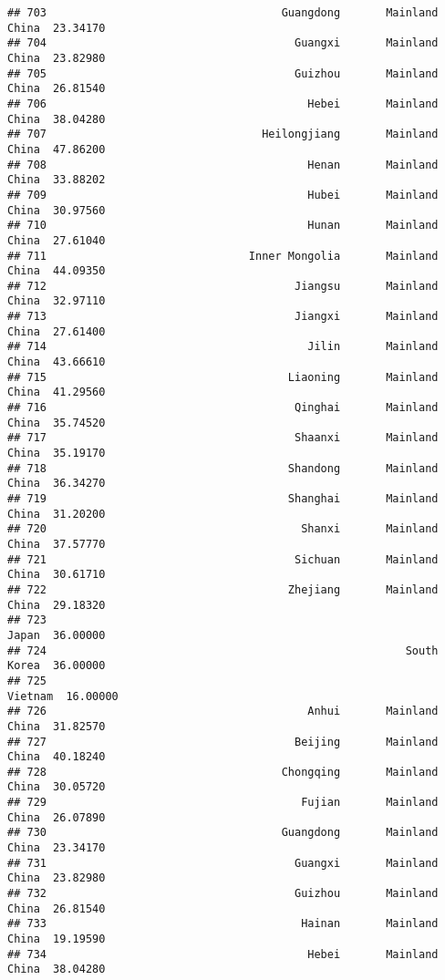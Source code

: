 \documentclass[
]{article}
\begin{document}
\begin{verbatim}
## 703                                    Guangdong       Mainland China  23.34170
## 704                                      Guangxi       Mainland China  23.82980
## 705                                      Guizhou       Mainland China  26.81540
## 706                                        Hebei       Mainland China  38.04280
## 707                                 Heilongjiang       Mainland China  47.86200
## 708                                        Henan       Mainland China  33.88202
## 709                                        Hubei       Mainland China  30.97560
## 710                                        Hunan       Mainland China  27.61040
## 711                               Inner Mongolia       Mainland China  44.09350
## 712                                      Jiangsu       Mainland China  32.97110
## 713                                      Jiangxi       Mainland China  27.61400
## 714                                        Jilin       Mainland China  43.66610
## 715                                     Liaoning       Mainland China  41.29560
## 716                                      Qinghai       Mainland China  35.74520
## 717                                      Shaanxi       Mainland China  35.19170
## 718                                     Shandong       Mainland China  36.34270
## 719                                     Shanghai       Mainland China  31.20200
## 720                                       Shanxi       Mainland China  37.57770
## 721                                      Sichuan       Mainland China  30.61710
## 722                                     Zhejiang       Mainland China  29.18320
## 723                                                             Japan  36.00000
## 724                                                       South Korea  36.00000
## 725                                                           Vietnam  16.00000
## 726                                        Anhui       Mainland China  31.82570
## 727                                      Beijing       Mainland China  40.18240
## 728                                    Chongqing       Mainland China  30.05720
## 729                                       Fujian       Mainland China  26.07890
## 730                                    Guangdong       Mainland China  23.34170
## 731                                      Guangxi       Mainland China  23.82980
## 732                                      Guizhou       Mainland China  26.81540
## 733                                       Hainan       Mainland China  19.19590
## 734                                        Hebei       Mainland China  38.04280

\end{verbatim}
\end{document}
